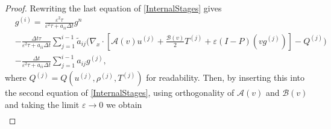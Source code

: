 \documentclass[10pt,a4paper]{amsart}
\begin{document}
\begin{proof}
Rewriting the last equation of \eqref{InternalStages} gives
\begin{align}
	\label{InternalStagesForg}
&g^{(i)} = \, \frac{\varepsilon^2 \tau}{\varepsilon^2 \tau + a_{ii} \Delta t} g^n \nonumber \\
&- \frac{\Delta t \tau}{\varepsilon^2 \tau + a_{ii} \Delta t} \sum_{j=1}^{i-1} \tilde{a}_{ij} \Biggl( \nabla_x \cdot \left[ \mathcal{A}(v) u^{(j)} + \frac{\mathcal{B}(v)}{2} T^{(j)} + \varepsilon (I-P)(vg^{(j)}) \right] - Q^{(j)} \Biggr) \\
&- \frac{\Delta t}{\varepsilon^2 \tau + a_{ii} \Delta t} \sum_{j=1}^{i-1} a_{ij} g^{(j)},\nonumber
\end{align}
where $Q^{(j)} = Q(u^{(j)},\rho^{(j)},T^{(j)})$ for readability. Then, by inserting  this %
into the second equation of \eqref{InternalStages}, using orthogonality of $\mathcal{A}(v)$ and $\mathcal{B}(v)$  and taking the limit $\varepsilon \to 0$ we obtain
\begin{equation}
\begin{split}

\end{split}
\end{equation}
\end{proof}
\end{document}
